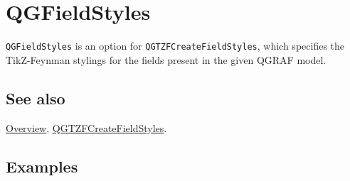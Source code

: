 \documentclass[../FeynHelpersManual.tex]{subfiles}
\begin{document}
\hypertarget{qgfieldstyles}{
\section{QGFieldStyles}\label{qgfieldstyles}}

\texttt{QGFieldStyles} is an option for \texttt{QGTZFCreateFieldStyles},
which specifies the TikZ-Feynman stylings for the fields present in the
given QGRAF model.

\subsection{See also}

\hyperlink{toc}{Overview},
\hyperlink{qgtzfcreatefieldstyles}{QGTZFCreateFieldStyles}.

\subsection{Examples}
\end{document}
